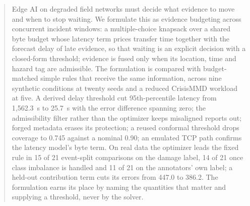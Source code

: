 \documentclass[conference,a4paper]{IEEEtran}
\newif\ifsixpage
\begin{document}
\begin{abstract}
\ifsixpage
Edge AI on degraded field networks must decide what evidence to move and when to stop waiting. We formulate this as evidence budgeting across concurrent incident windows: a multiple-choice knapsack over a shared byte budget whose latency term prices transfer time together with the forecast delay of late evidence, so that waiting is an explicit decision with a closed-form threshold; evidence is fused only when its location, time and hazard tag are admissible. The formulation is compared with budget-matched simple rules that receive the same information, across nine synthetic conditions at twenty seeds and a reduced CrisisMMD workload at five. A derived delay threshold cut 95th-percentile latency from 1{,}562.3~s to 25.7~s with the error difference spanning zero; the admissibility filter rather than the optimizer keeps misaligned reports out; forged metadata erases its protection; a reused conformal threshold drops coverage to 0.745 against a nominal 0.90; an emulated TCP path confirms the latency model's byte term. On real data the optimizer leads the fixed rule in 15 of 21 event-split comparisons on the damage label, 14 of 21 once class imbalance is handled and 11 of 21 on the annotators' own label; a held-out contribution term cuts its errors from 447.0 to 386.2. The formulation earns its place by naming the quantities that matter and supplying a threshold, never by the solver.
\else

\end{abstract}
\end{document}
